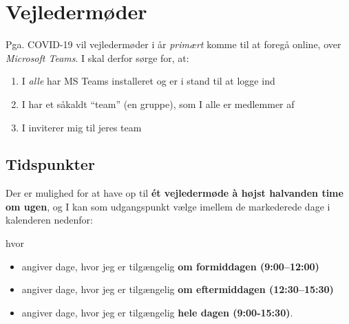 \section{Vejledermøder}
\label{sec:meetings}
Pga. COVID-19 vil vejledermøder i år \emph{primært} komme til at foregå online, over \emph{Microsoft Teams}.
I skal derfor sørge for, at:
\begin{enumerate}
\item I \emph{alle} har MS Teams installeret og er i stand til at logge ind
\item I har et såkaldt ``team'' (en gruppe), som I alle er medlemmer af
\item I inviterer mig til jeres team
\end{enumerate}

\subsection{Tidspunkter}
\label{subsec:times}
Der er mulighed for at have op til \textbf{\'et vejledermøde \`a højst halvanden time om ugen}, og I kan som udgangspunkt vælge imellem de markederede dage i kalenderen nedenfor:
\begin{center}
  
\end{center}
hvor
\begin{itemize}[label={},wide,labelindent=0pt,topsep=1ex]
\item {} angiver dage, hvor jeg er tilgængelig \textbf{om formiddagen (9:00--12:00)}
\item {} angiver dage, hvor jeg er tilgængelig \textbf{om eftermiddagen (12:30--15:30)}
\item {} angiver dage, hvor jeg er tilgængelig \textbf{hele dagen (9:00-15:30)}.
\end{itemize}

